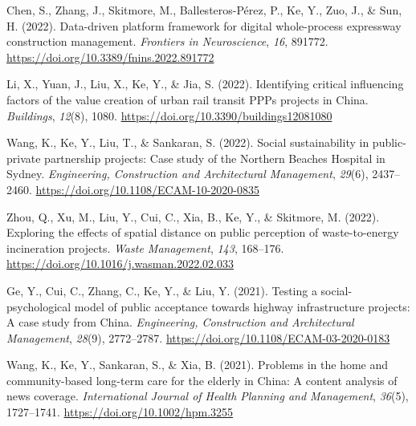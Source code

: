 \documentclass[11pt,a4paper]{report} %
\begin{document}
\begin{tablist}
        \item[2022] \tab{}Chen, S., Zhang, J., Skitmore, M., Ballesteros-Pérez, P., Ke, Y., Zuo, J., \& Sun, H. (2022). Data-driven platform framework for digital whole-process expressway construction management. \textit{Frontiers in Neuroscience}, \textit{16}, 891772. \href{https://doi.org/10.3389/fnins.2022.891772}{https://doi.org/10.3389/fnins.2022.891772}
        
        \item[2022] \tab{}Li, X., Yuan, J., Liu, X., Ke, Y., \& Jia, S. (2022). Identifying critical influencing factors of the value creation of urban rail transit PPPs projects in China. \textit{Buildings}, \textit{12}(8), 1080. \href{https://doi.org/10.3390/buildings12081080}{https://doi.org/10.3390/buildings12081080}
        
        \item[2022] \tab{}Wang, K., Ke, Y., Liu, T., \& Sankaran, S. (2022). Social sustainability in public-private partnership projects: Case study of the Northern Beaches Hospital in Sydney. \textit{Engineering, Construction and Architectural Management}, \textit{29}(6), 2437--2460. \href{https://doi.org/10.1108/ECAM-10-2020-0835}{https://doi.org/10.1108/ECAM-10-2020-0835}
        
        \item[2022] \tab{}Zhou, Q., Xu, M., Liu, Y., Cui, C., Xia, B., Ke, Y., \& Skitmore, M. (2022). Exploring the effects of spatial distance on public perception of waste-to-energy incineration projects. \textit{Waste Management}, \textit{143}, 168--176. \href{https://doi.org/10.1016/j.wasman.2022.02.033}{https://doi.org/10.1016/j.wasman.2022.02.033}
        
        \item[2021] \tab{}Ge, Y., Cui, C., Zhang, C., Ke, Y., \& Liu, Y. (2021). Testing a social-psychological model of public acceptance towards highway infrastructure projects: A case study from China. \textit{Engineering, Construction and Architectural Management}, \textit{28}(9), 2772--2787. \href{https://doi.org/10.1108/ECAM-03-2020-0183}{https://doi.org/10.1108/ECAM-03-2020-0183}
        
        \item[2021] \tab{}Wang, K., Ke, Y., Sankaran, S., \& Xia, B. (2021). Problems in the home and community-based long-term care for the elderly in China: A content analysis of news coverage. \textit{International Journal of Health Planning and Management}, \textit{36}(5), 1727--1741. \href{https://doi.org/10.1002/hpm.3255}{https://doi.org/10.1002/hpm.3255}
        

\end{tablist}
\end{document}

